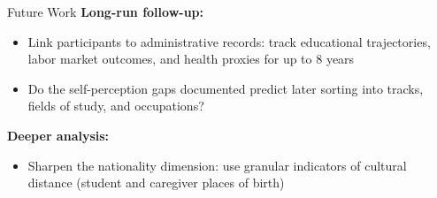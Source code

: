 \documentclass[xcolor=usenames,dvipsnames]{beamer}
\begin{document}
\begin{frame}{Future Work}\label{future}
\small
\textbf{Long-run follow-up:}
\begin{itemize}
    \item Link participants to administrative records: track educational trajectories, labor market outcomes, and health proxies for up to 8 years
    \item Do the self-perception gaps documented predict later sorting into tracks, fields of study, and occupations?
\end{itemize}
\vspace{0.3cm}
  \textbf{Deeper analysis:}                       
  \begin{itemize}                                 
     \item Sharpen the nationality dimension: use granular indicators of cultural distance (student and 
  caregiver places
     of birth)                                       \end{itemize} 
\hyperlink{slide:policy}{}
\end{frame}
\end{document}
